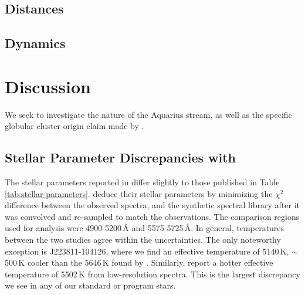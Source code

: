 \documentclass{emulateapj}
\begin{document}


\subsection{Distances}



\subsection{Dynamics}




\section{Discussion}


We seek to investigate the nature of the Aquarius stream, as well as the specific globular cluster origin claim made by \citet{wylie-de-boer;et-al_2012}. 

\subsection{Stellar Parameter Discrepancies with \citet{wylie-de-boer;et-al_2012}}

The stellar parameters reported in \citet{wylie-de-boer;et-al_2012} differ slightly to those published in Table \ref{tab:stellar-parameters}. \citet{wylie-de-boer;et-al_2012} deduce their stellar parameters by minimizing the $\chi^2$ difference between the observed spectra, and the \citet{munari;et-al_2005} synthetic spectral library after it was convolved and re-sampled to match the observations. The comparison regions used for analysis were 4900-5200\,{\AA} and 5575-5725\,{\AA}. In general, temperatures between the two studies agree within the uncertainties. The only noteworthy exception is J223811-104126, where we find an effective temperature of 5140\,K, ${\sim}$500\,K cooler than the 5646\,K found by \citet{wylie-de-boer;et-al_2012}.  Similarly, \citet{williams;et-al_2011} report a hotter effective temperature of 5502\,K from low-resolution spectra. This is the largest discrepancy we see in any of our standard or program stars.
\end{document}
